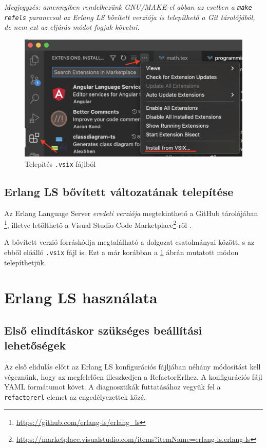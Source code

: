 \textit{Megjegyzés: amennyiben rendelkezünk GNU/MAKE-el abban az esetben a \lstinline{make refels} paranccsal az Erlang LS bővített verziója is telepíthető a Git tárolójából, de nem ezt az eljárás módot fogjuk követni.}


\begin{figure}[H]
  \centering
  \includegraphics[width=\linewidth]{images/vsix_install.png}
  \caption{Telepítés \lstinline{.vsix} fájlból}
  \label{fig:vsix_install}
\end{figure}

\subsection{Erlang LS bővített változatának telepítése}
Az Erlang Language Server \textit{eredeti verziója} megtekinthető a GitHub tárolójában \footnote{\url{https://github.com/erlang-ls/erlang_ls}}, illetve letölthető a Visual Studio Code Marketplace\footnote{\url{https://marketplace.visualstudio.com/items?itemName=erlang-ls.erlang-ls}}-ről .

A bővített verzió forráskódja megtalálható a dolgozat csatolmányai között, s az ebből előálló \lstinline{.vsix} fájl is. Ezt a már korábban a \ref{fig:vsix_install} ábrán mutatott módon telepíthetjük.

\section{Erlang LS használata}
\subsection{Első elindításkor szükséges beállítási lehetőségek} \label{ELSfirstStart}
Az első elidulás előtt az Erlang LS konfigurációs \cite{erlangLsConfig} fájljában néhány módosítást kell végeznünk, hogy az megfelelően illeszkedjen a RefactorErlhez. A konfigurációs fájl YAML formátumot követ. 
A diagnosztikák futtatásához vegyük fel a \lstinline{refactorerl} elemet az engedélyezettek közé. 

